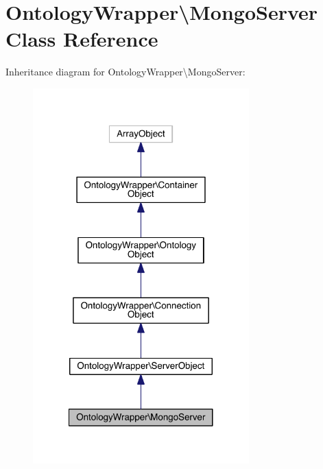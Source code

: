 \hypertarget{class_ontology_wrapper_1_1_mongo_server}{\section{Ontology\-Wrapper\textbackslash{}Mongo\-Server Class Reference}
\label{class_ontology_wrapper_1_1_mongo_server}
}


Inheritance diagram for Ontology\-Wrapper\textbackslash{}Mongo\-Server\-:\nopagebreak
\begin{figure}[H]
\begin{center}
\leavevmode
\includegraphics[width=236pt]{class_ontology_wrapper_1_1_mongo_server__inherit__graph}
\end{center}
\end{figure}


